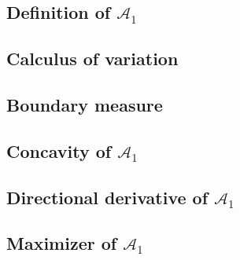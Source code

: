 
\subsection{Definition of $\mathcal{A}_1$}
\label{sec:definition-of-a1}


\subsection{Calculus of variation}
\label{sec:calculus-of-variation}


\subsection{Boundary measure}
\label{sec:boundary-measure}


\subsection{Concavity of $\mathcal{A}_1$}
\label{sec:concavity-of-a1}


\subsection{Directional derivative of $\mathcal{A}_1$}
\label{sec:directional-derivative-of-a1}


\subsection{Maximizer of $\mathcal{A}_1$}
\label{sec:maximizer-of-a1}



